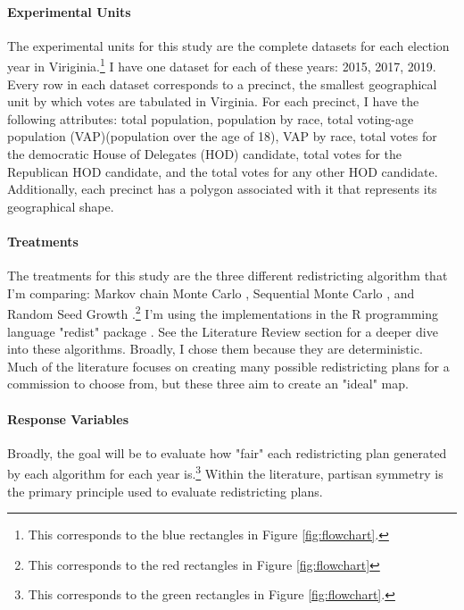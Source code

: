 \paragraph{Experimental Units}

The experimental units for this study are the complete datasets for each election year in Viriginia.\footnote{This corresponds to the blue rectangles in Figure \ref{fig:flowchart}.} I have one dataset for each of these years: 2015, 2017, 2019. Every row in each dataset corresponds to a precinct, the smallest geographical unit by which votes are tabulated in Virginia. For each precinct, I have the following attributes: total population, population by race, total voting-age population (VAP)(population over the age of 18), VAP by race, total votes for the democratic House of Delegates (HOD) candidate, total votes for the Republican HOD candidate, and the total votes for any other HOD candidate. Additionally, each precinct has a polygon associated with it that represents its geographical shape. 

\paragraph{Treatments}

The treatments for this study are the three different redistricting algorithm that I'm comparing: Markov chain Monte Carlo \parencite{fifield2020}, Sequential Monte Carlo \parencite{mccartan2020}, and Random Seed Growth \parencite{chen2013}.\footnote{This corresponds to the red rectangles in Figure \ref{fig:flowchart}} I'm using the implementations in the R programming language "redist" package \parencite{fifield2020d}. See the Literature Review section for a deeper dive into these algorithms. Broadly, I chose them because they are deterministic. Much of the literature focuses on creating many possible redistricting plans for a commission to choose from, but these three aim to create an "ideal" map. 

\paragraph{Response Variables}

Broadly, the goal will be to evaluate how "fair" each redistricting plan generated by each algorithm for each year is.\footnote{This corresponds to the green rectangles in Figure \ref{fig:flowchart}.} Within the literature, partisan symmetry is the primary principle used to evaluate redistricting plans. 

